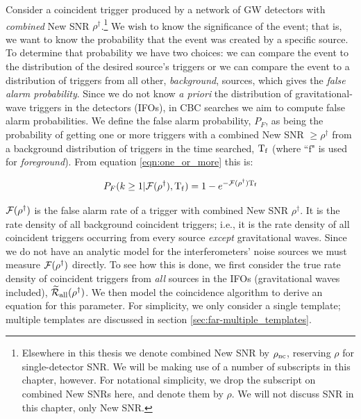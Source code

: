 Consider a coincident trigger produced by a network of \ac{GW} detectors with
\emph{combined} New \ac{SNR} $\rho^\dagger$.\footnote{Elsewhere in this thesis
we denote combined New \ac{SNR} by $\rho_{\mathrm{nc}}$, reserving $\rho$ for
single-detector \ac{SNR}. We will be making use of a number of subscripts in
this chapter, however. For notational simplicity, we drop the subscript on
combined New \acp{SNR} here, and denote them by $\rho$. We will not discuss
\ac{SNR} in this chapter, only New \ac{SNR}.} We wish to know the significance
of the event; that is, we want to know the probability that the event was
created by a specific source. To determine that probability we have two
choices: we can compare the event to the distribution of the desired source's
triggers or we can compare the event to a distribution of triggers from all
other, \emph{background}, sources, which gives the \emph{false alarm
probability}. Since we do not know \emph{a priori} the distribution of
gravitational-wave triggers in the detectors (IFOs), in \ac{CBC} searches we aim to
compute false alarm probabilities. We define the false alarm probability,
$P_F$, as being the probability of getting one or more triggers with a combined
New \ac{SNR} $\geq \rho^\dagger$ from a background distribution of triggers in
the time searched, $\mathrm{T_f}$ (where ``$\mathrm{f}$" is used for \emph{foreground}).
From equation \ref{eqn:one_or_more} this is:

\begin{equation}
P_F(k\geq1 | \mathcal{F}(\rho^\dagger), \mathrm{T_f}) = 1 - e^{-\mathcal{F}(\rho^\dagger) \mathrm{T_f}}
\end{equation}

$\mathcal{F}(\rho^\dagger)$ is the false alarm rate of a trigger with combined New
\ac{SNR} $\rho^\dagger$. It is the rate density of all background coincident
triggers; i.e., it is the rate density of all coincident triggers occurring
from every source \emph{except} gravitational waves. Since we do not have an
analytic model for the interferometers' noise sources we must measure
$\mathcal{F}(\rho^\dagger)$ directly. To see how this is done, we first consider the
true rate density of coincident triggers from \emph{all} sources in the
\acp{IFO} (gravitational waves included),
$\widetilde{\mathcal{R}}_\mathrm{all}(\rho^\dagger)$. We then model the coincidence
algorithm to derive an equation for this parameter. For simplicity, we only
consider a single template; multiple templates are discussed in section
\ref{sec:far-multiple_templates}.

